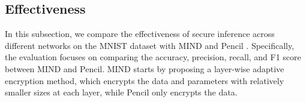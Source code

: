 \documentclass[conference]{IEEEtran}
\begin{document}
\begin{itemize}
\end{itemize}











\subsection{Effectiveness}
In this subsection, we compare the effectiveness of secure inference across different networks on the MNIST dataset with MIND and Pencil \cite{liu2024pencilprivateextensiblecollaborative}.
Specifically, the evaluation focuses on comparing the accuracy, precision, recall, and F1 score between MIND and Pencil.
MIND starts by proposing a layer-wise adaptive encryption method, which encrypts the data and parameters with relatively smaller sizes at each layer, while Pencil only encrypts the data.














\end{document}
